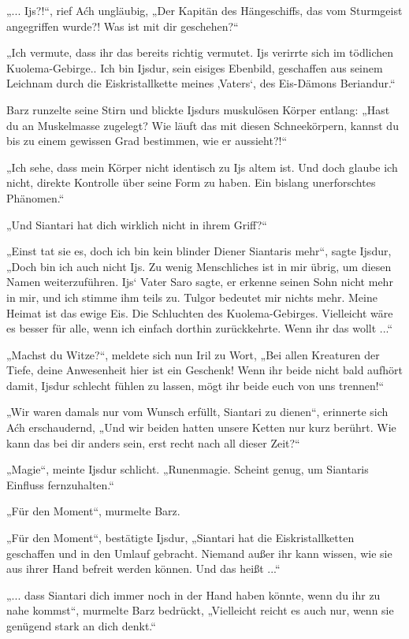 „... Ijs?!“, rief Aćh ungläubig, „Der Kapitän des Hängeschiffs, das vom Sturmgeist angegriffen wurde?! Was ist mit dir geschehen?“

„Ich vermute, dass ihr das bereits richtig vermutet. Ijs verirrte sich im tödlichen Kuolema-Gebirge.. Ich bin Ijsdur, sein eisiges Ebenbild, geschaffen aus seinem Leichnam durch die Eiskristallkette meines ‚Vaters‘, des Eis-Dämons Beriandur.“

Barz runzelte seine Stirn und blickte Ijsdurs muskulösen Körper entlang: „Hast du an Muskelmasse zugelegt? Wie läuft das mit diesen Schneekörpern, kannst du bis zu einem gewissen Grad bestimmen, wie er aussieht?!“

„Ich sehe, dass mein Körper nicht identisch zu Ijs altem ist. Und doch glaube ich nicht, direkte Kontrolle über seine Form zu haben. Ein bislang unerforschtes Phänomen.“

„Und Siantari hat dich wirklich nicht in ihrem Griff?“

„Einst tat sie es, doch ich bin kein blinder Diener Siantaris mehr“, sagte Ijsdur, „Doch bin ich auch nicht Ijs. Zu wenig Menschliches ist in mir übrig, um diesen Namen weiterzuführen. Ijs‘ Vater Saro sagte, er erkenne seinen Sohn nicht mehr in mir, und ich stimme ihm teils zu. Tulgor bedeutet mir nichts mehr. Meine Heimat ist das ewige Eis. Die Schluchten des Kuolema-Gebirges. Vielleicht wäre es besser für alle, wenn ich einfach dorthin zurückkehrte. Wenn ihr das wollt ...“

„Machst du Witze?“, meldete sich nun Iril zu Wort, „Bei allen Kreaturen der Tiefe, deine Anwesenheit hier ist ein Geschenk! Wenn ihr beide nicht bald aufhört damit, Ijsdur schlecht fühlen zu lassen, mögt ihr beide euch von uns trennen!“

„Wir waren damals nur vom Wunsch erfüllt, Siantari zu dienen“, erinnerte sich Aćh erschaudernd, „Und wir beiden hatten unsere Ketten nur kurz berührt. Wie kann das bei dir anders sein, erst recht nach all dieser Zeit?“

„Magie“, meinte Ijsdur schlicht. „Runenmagie. Scheint genug, um Siantaris Einfluss fernzuhalten.“

„Für den Moment“, murmelte Barz.

„Für den Moment“, bestätigte Ijsdur, „Siantari hat die Eiskristallketten geschaffen und in den Umlauf gebracht. Niemand außer ihr kann wissen, wie sie aus ihrer Hand befreit werden können. Und das heißt ...“

„... dass Siantari dich immer noch in der Hand haben könnte, wenn du ihr zu nahe kommst“, murmelte Barz bedrückt, „Vielleicht reicht es auch nur, wenn sie genügend stark an dich denkt.“

